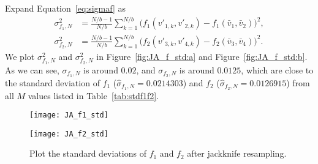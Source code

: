 \Answer{}
Expand Equation~\eqref{eq:sigmaf} as
%
\begin{align}
    \sigma^2_{f_1,N} & = \frac{ N/b - 1 }{ N/b }
    \sum_{k=1}^{N/b} \bigl( f_1(v'_{1,k}, v'_{2,k}) - f_1(\bar{v}_1, \bar{v}_2) \bigr)^2, \\
    \sigma^2_{f_2,N} & = \frac{ N/b - 1 }{ N/b }
    \sum_{k=1}^{N/b} \bigl( f_2(v'_{3,k}, v'_{4,k}) - f_2(\bar{v}_3, \bar{v}_4) \bigr)^2.
\end{align}
%
We plot \(\sigma^2_{f_1,N}\) and \(\sigma^2_{f_2,N}\) in Figure~\ref{fig:JA_f_std:a}
and Figure~\ref{fig:JA_f_std:b}.
As we can see, \(\sigma_{f_1,N}\) is around \(0.02\),
and \(\sigma_{f_2,N}\) is around \(0.0125\), which are close to the standard deviation
of \(f_1\) (\(\hat{\sigma}_{f_1,N} = 0.0214303\)) and
\(f_2\) (\(\hat{\sigma}_{f_2,N} = 0.0126915\))
from all \(M\) values listed in Table~\ref{tab:stdf1f2}.
%
\begin{figure}
    \centering
    \begin{minipage}[t]{0.8\linewidth}
        \centering
        \texttt{[image: JA\_f1\_std]}
        \label{fig:JA_f_std:a}
    \end{minipage}
    \hfill
    \begin{minipage}[t]{0.8\linewidth}
        \centering
        \texttt{[image: JA\_f2\_std]}
        \label{fig:JA_f_std:b}
    \end{minipage}
    \caption{Plot the standard deviations of \(f_1\) and \(f_2\) after jackknife resampling.}
    \label{fig:JA_f_std}
\end{figure}
